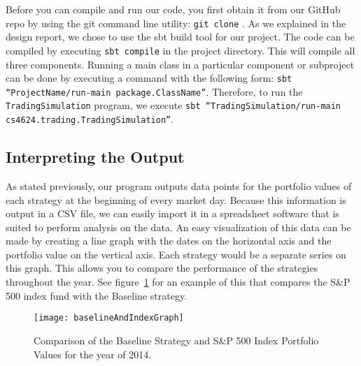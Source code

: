 Before you can compile and run our code, you first obtain it from our GitHub repo by using the git command line utility: \texttt{git clone}  \cite{github}. As we explained in the design report, we chose to use the sbt build tool for our project. The code can be compiled by executing \texttt{sbt compile} in the project directory. This will compile all three components. Running a main class in a particular component or subproject can be done by executing a command with the following form: \texttt{sbt ``ProjectName/run-main package.ClassName''}. Therefore, to run the \texttt{TradingSimulation} program, we execute \texttt{sbt ``TradingSimulation/run-main cs4624.trading.TradingSimulation''}.

\subsection{Interpreting the Output}

As stated previously, our program outputs data points for the portfolio values of each strategy at the beginning of every market day. Because this information is output in a CSV file, we can easily import it in a spreadsheet software that is suited to perform analysis on the data. An easy visualization of this data can be made by creating a line graph with the dates on the horizontal axis and the portfolio value on the vertical axis. Each strategy would be a separate series on this graph. This allows you to compare the performance of the strategies throughout the year. See figure~\ref{baselineAndIndexGraph} for an example of this that compares the S\&P 500 index fund with the Baseline strategy.

\begin{figure}[h]
  \label{baselineAndIndexGraph}
  \begin{center}
    \texttt{[image: baselineAndIndexGraph]}
  \end{center}
  \caption{Comparison of the Baseline Strategy and S\&P 500 Index Portfolio Values for the year of 2014.}
\end{figure}

